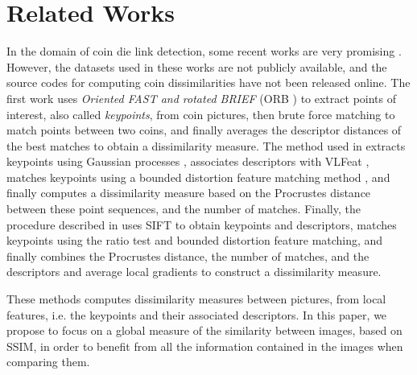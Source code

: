 \section{Related Works}
\label{sec:rw}

In the domain of coin die link detection, some recent works are very promising \cite{taylor2020computer, Base, Cohesion}.
However, the datasets used in these works are not publicly available, and the source codes for computing coin dissimilarities have not been released online. The first work \cite{taylor2020computer} uses \textit{Oriented FAST and rotated BRIEF} (ORB \cite{rublee2011orb}) to extract points of interest, also called \textit{keypoints}, from coin pictures, then brute force matching to match points between two coins, and finally averages the descriptor distances of the best matches to obtain a dissimilarity measure. The method used in \cite{Base} extracts keypoints using Gaussian processes \cite{Gaussian}, associates descriptors with VLFeat \cite{vedaldi2010vlfeat}, matches keypoints using a bounded distortion feature matching method \cite{lipman2014feature}, and finally computes a dissimilarity measure based on the Procrustes distance between these point sequences, and the number of matches. Finally, the procedure described in \cite{Cohesion} uses SIFT to obtain keypoints and descriptors, matches keypoints using the ratio test \cite{lowe2004distinctive} and bounded distortion feature matching, and finally combines the Procrustes distance, the number of matches, and the descriptors and average local gradients to construct a dissimilarity measure.

These methods computes dissimilarity measures between pictures, from local features, i.e. the keypoints and their associated descriptors. In this paper, we propose to focus on a global measure of the similarity between images, based on SSIM, in order to benefit from all the information contained in the images when comparing them.